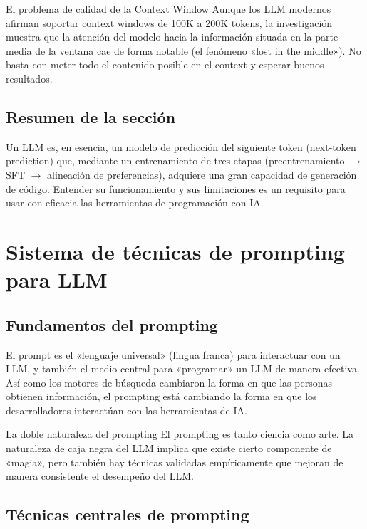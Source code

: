 \documentclass[a4paper]{article}
\begin{document}
\begin{warningbox}{El problema de calidad de la Context Window}
Aunque los LLM modernos afirman soportar context windows de 100K a 200K tokens, la investigación muestra que la atención del modelo hacia la información situada en la parte media de la ventana cae de forma notable (el fenómeno «lost in the middle»). No basta con meter todo el contenido posible en el context y esperar buenos resultados.
\end{warningbox}

\subsection{Resumen de la sección}

Un LLM es, en esencia, un modelo de predicción del siguiente token (next-token prediction) que, mediante un entrenamiento de tres etapas (preentrenamiento $\rightarrow$ SFT $\rightarrow$ alineación de preferencias), adquiere una gran capacidad de generación de código. Entender su funcionamiento y sus limitaciones es un requisito para usar con eficacia las herramientas de programación con IA.
\section{Sistema de técnicas de prompting para LLM}

\subsection{Fundamentos del prompting}

El prompt es el «lenguaje universal» (lingua franca) para interactuar con un LLM, y también el medio central para «programar» un LLM de manera efectiva. Así como los motores de búsqueda cambiaron la forma en que las personas obtienen información, el prompting está cambiando la forma en que los desarrolladores interactúan con las herramientas de IA.

\begin{knowledgebox}{La doble naturaleza del prompting}
El prompting es tanto ciencia como arte. La naturaleza de caja negra del LLM implica que existe cierto componente de «magia», pero también hay técnicas validadas empíricamente que mejoran de manera consistente el desempeño del LLM.
\end{knowledgebox}

\subsection{Técnicas centrales de prompting}
\end{document}

